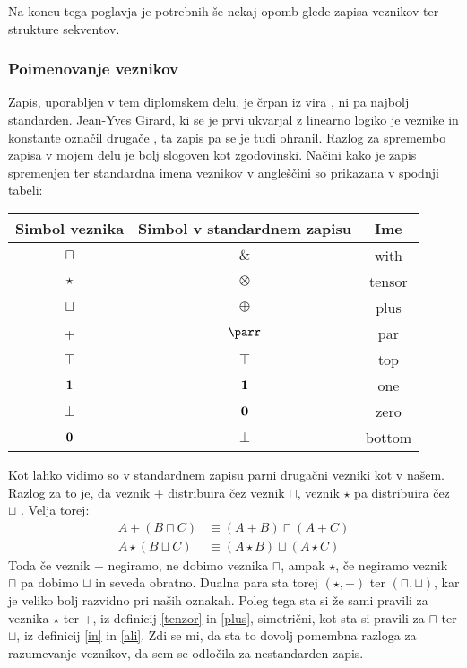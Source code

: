 Na koncu tega poglavja je potrebnih še nekaj opomb glede zapisa veznikov ter strukture sekventov.

\subsubsection{Poimenovanje veznikov}

Zapis, uporabljen v tem diplomskem delu, je črpan iz vira \cite{troelstra}, ni pa najbolj standarden. Jean-Yves Girard, ki se je prvi ukvarjal z linearno logiko je veznike in konstante označil drugače \cite{girard}, ta zapis pa se je tudi ohranil. Razlog za spremembo zapisa v mojem delu je bolj slogoven kot zgodovinski. Načini kako je zapis spremenjen ter standardna imena veznikov v angleščini so prikazana v spodnji tabeli:
\begin{center}
\begin{tabular}{||c|c|c||}
    \hline
    Simbol veznika & Simbol v standardnem zapisu & Ime \\
    \hline\hline
    $\sqcap$ & $\&$ & with \\
    \hline
    $\star$ & $\otimes$ & tensor \\
    \hline
    $\sqcup$ & $\oplus$ & plus \\
    \hline
    + & $\parr$ & par \\
    \hline
    $\top$ & $\top$ & top \\
    \hline
    $\mathbf{1}$ & $\mathbf{1}$ & one \\
    \hline
    $\bot$ & $\mathbf{0}$ & zero \\
    \hline
    $\mathbf{0}$ & $\bot$ & bottom \\
    \hline
    \end{tabular}
\end{center}
Kot lahko vidimo so v standardnem zapisu parni drugačni vezniki kot v našem. Razlog za to je, da veznik + distribuira čez veznik $\sqcap$, veznik $\star$ pa distribuira čez $\sqcup$ \cite[trditev 1.13]{girard}. Velja torej:
\begin{align*}
    A + (B \sqcap C) &\equiv (A + B) \sqcap (A + C)\\
    A \star (B \sqcup C) &\equiv (A \star B) \sqcup (A \star C)
\end{align*}
Toda če veznik + negiramo, ne dobimo veznika $\sqcap$, ampak $\star$, če negiramo veznik $\sqcap$ pa dobimo $\sqcup$ in seveda obratno. Dualna para sta torej $(\star,+)$ ter $(\sqcap,\sqcup)$, kar je veliko bolj razvidno pri naših oznakah. Poleg tega sta si že sami pravili za veznika $\star$ ter +, iz definicij \ref{tenzor} in \ref{plus}, simetrični, kot sta si pravili za $\sqcap$ ter $\sqcup$, iz definicij \ref{in} in \ref{ali}. Zdi se mi, da sta to dovolj pomembna razloga za razumevanje veznikov, da sem se odločila za nestandarden zapis.

